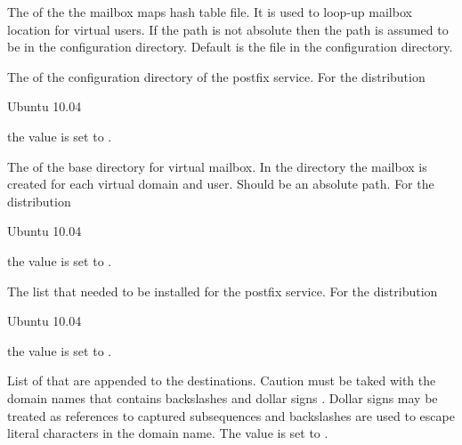 The  of the the mailbox maps hash table file. It is used to loop-up
mailbox location for virtual users. 
If the path is not absolute then the path is assumed to be in the 
configuration directory. 
Default is the file  in the configuration directory.


The  of the configuration directory of the postfix service. 
For the distribution
\begin{inparaitem}
\item[\TheDistribution{ubuntu}] Ubuntu 10.04
\end{inparaitem}
the value is set to .


The  of the base directory for virtual mailbox.
In the directory the mailbox is created for each virtual domain and user.
Should be an absolute path.
For the distribution
\begin{inparaitem}
\item[\TheDistribution{ubuntu}] Ubuntu 10.04
\end{inparaitem}
the value is set to .


The  list that needed to be installed for the postfix service.
For the distribution
\begin{inparaitem}
\item[\TheDistribution{ubuntu}] Ubuntu 10.04
\end{inparaitem}
the value is set to .


List of  that are appended to the destinations.
Caution must be taked with the domain names that contains backslashes \qcode{\textbackslash} and 
dollar signs \qcode{\$}. Dollar signs may be treated as references to 
captured subsequences and backslashes are used to escape literal characters  in the domain name.
The value is set to .

